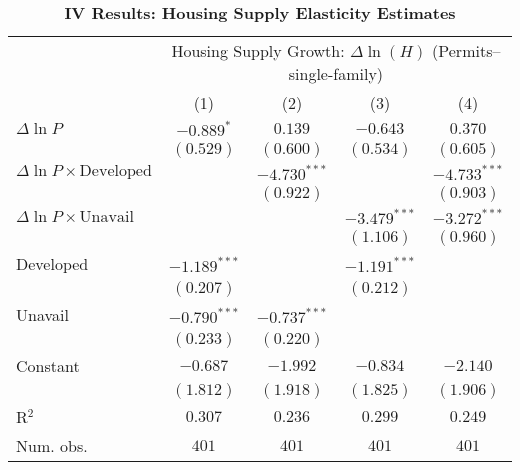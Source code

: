 
\begin{table}[H]
\caption{\textbf{IV Results: Housing Supply Elasticity Estimates}}
\begin{center}
\begin{scriptsize}
\begin{threeparttable}
\begin{tabular}{l c c c c}
\toprule
 & \multicolumn{4}{c}{Housing Supply Growth: $\Delta\ln(H)$ (Permits--single-family)} \\
\cmidrule(lr){2-5}
 & (1) & (2) & (3) & (4) \\
\midrule
$\Delta\ln P$                         & $-0.889^{*}$   & $0.139$        & $-0.643$       & $0.370$        \\
                                      & $(0.529)$      & $(0.600)$      & $(0.534)$      & $(0.605)$      \\
$\Delta\ln P\times{\text{Developed}}$ &                & $-4.730^{***}$ &                & $-4.733^{***}$ \\
                                      &                & $(0.922)$      &                & $(0.903)$      \\
$\Delta\ln P\times{\text{Unavail}}$   &                &                & $-3.479^{***}$ & $-3.272^{***}$ \\
                                      &                &                & $(1.106)$      & $(0.960)$      \\
Developed                             & $-1.189^{***}$ &                & $-1.191^{***}$ &                \\
                                      & $(0.207)$      &                & $(0.212)$      &                \\
Unavail                               & $-0.790^{***}$ & $-0.737^{***}$ &                &                \\
                                      & $(0.233)$      & $(0.220)$      &                &                \\
Constant                              & $-0.687$       & $-1.992$       & $-0.834$       & $-2.140$       \\
                                      & $(1.812)$      & $(1.918)$      & $(1.825)$      & $(1.906)$      \\
\midrule
R$^2$                                 & $0.307$        & $0.236$        & $0.299$        & $0.249$        \\
Num. obs.                             & $401$          & $401$          & $401$          & $401$          \\

\end{tabular}
\end{threeparttable}
\end{scriptsize}
\end{center}
\end{table}
